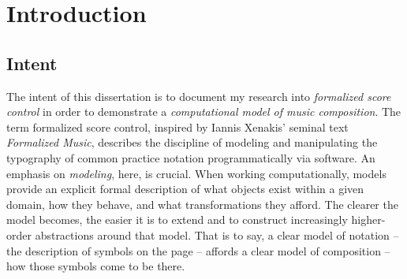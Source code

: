 \chapter{Introduction}
\label{chap:introduction}

\section{Intent}
\label{sec:intent}

The intent of this dissertation is to document my research into
\emph{formalized score control}\cite{ baca2011xi, baca2015tenor,
trevino2013compositional} in order to demonstrate a \emph{computational model
of music composition}. The term formalized score control, inspired by Iannis
Xenakis' seminal text \emph{Formalized Music}\cite{xenakis1992formalized,
baca2012}, describes the discipline of modeling and manipulating the typography
of common practice notation programmatically via software. An emphasis on
\emph{modeling}, here, is crucial. When working computationally, models provide
an explicit formal description of what objects exist within a given domain, how
they behave, and what transformations they afford. The clearer the model
becomes, the easier it is to extend and to construct increasingly higher-order
abstractions around that model. That is to say, a clear model of notation --
the description of symbols on the page -- affords a clear model of composition
-- how those symbols come to be there.

